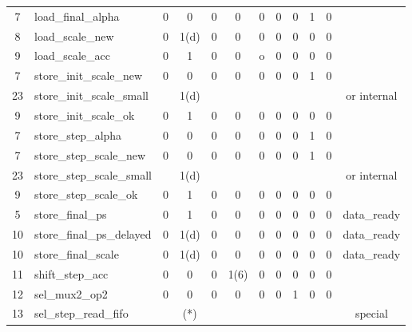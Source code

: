 \documentclass[mscthesis]{usiinfthesis}
\begin{document}
\begin{table}
\begin{center}
\begin{tabular}{|c|l|*{10}{c|}}
    7    & load\_final\_alpha          & 0    & 0      & 0    & 0          & 0      & 0      & 0    & 1    & 0     &             \\
    8    & load\_scale\_new            & 0    & 1(d)   & 0    & 0          & 0      & 0      & 0    & 0    & 0     &             \\
    9    & load\_scale\_acc            & 0    & 1      & 0    & 0          & o      & 0      & 0    & 0    & 0     &             \\
    7    & store\_init\_scale\_new     & 0    & 0      & 0    & 0          & 0      & 0      & 0    & 1    & 0     &             \\
    23   & store\_init\_scale\_small   &      & 1(d)   &      &            &        &        &      &      &       & or internal \\
    9    & store\_init\_scale\_ok      & 0    & 1      & 0    & 0          & 0      & 0      & 0    & 0    & 0     &             \\
    7    & store\_step\_alpha          & 0    & 0      & 0    & 0          & 0      & 0      & 0    & 1    & 0     &             \\
    7    & store\_step\_scale\_new     & 0    & 0      & 0    & 0          & 0      & 0      & 0    & 1    & 0     &             \\
    23   & store\_step\_scale\_small   &      & 1(d)   &      &            &        &        &      &      &       & or internal \\
    9    & store\_step\_scale\_ok      & 0    & 1      & 0    & 0          & 0      & 0      & 0    & 0    & 0     &             \\
    5    & store\_final\_ps            & 0    & 1      & 0    & 0          & 0      & 0      & 0    & 0    & 0     & data\_ready \\
    10   & store\_final\_ps\_delayed   & 0    & 1(d)   & 0    & 0          & 0      & 0      & 0    & 0    & 0     & data\_ready \\
    10   & store\_final\_scale         & 0    & 1(d)   & 0    & 0          & 0      & 0      & 0    & 0    & 0     & data\_ready \\
    11   & shift\_step\_acc            & 0    & 0      & 0    & 1(6)       & 0      & 0      & 0    & 0    & 0     &             \\
    12   & sel\_mux2\_op2              & 0    & 0      & 0    & 0          & 0      & 0      & 1    & 0    & 0     &             \\
    13   & sel\_step\_read\_fifo       &      & (*)    &      &            &        &        &      &      &       & special     \\

\end{tabular}
\end{center}
\end{table}
\end{document}
